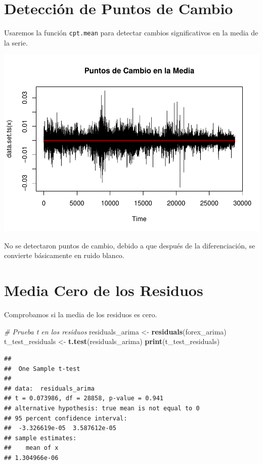\documentclass[
]{book}
\newenvironment{Shaded}{\begin{snugshade}}{\end{snugshade}}
\newcommand{\CommentTok}[1]{\textcolor[rgb]{0.56,0.35,0.01}{\textit{#1}}}
\newcommand{\FunctionTok}[1]{\textcolor[rgb]{0.13,0.29,0.53}{\textbf{#1}}}
\newcommand{\NormalTok}[1]{#1}
\newcommand{\OtherTok}[1]{\textcolor[rgb]{0.56,0.35,0.01}{#1}}
\begin{document}
\section{Detección de Puntos de Cambio}\label{detecciuxf3n-de-puntos-de-cambio}

Usaremos la función \texttt{cpt.mean} para detectar cambios significativos en la media de la serie.

\includegraphics{bookdown_time_series_files/figure-latex/change-point-1.pdf}

No se detectaron puntos de cambio, debido a que después de la diferenciación, se convierte básicamente en ruido blanco.

\section{Media Cero de los Residuos}\label{media-cero-de-los-residuos}

Comprobamos si la media de los residuos es cero.

\begin{Shaded}
\begin{Highlighting}[]
\CommentTok{\# Prueba t en los residuos}
\NormalTok{residuals\_arima }\OtherTok{\textless{}{-}} \FunctionTok{residuals}\NormalTok{(forex\_arima)}
\NormalTok{t\_test\_residuals }\OtherTok{\textless{}{-}} \FunctionTok{t.test}\NormalTok{(residuals\_arima)}
\FunctionTok{print}\NormalTok{(t\_test\_residuals)}
\end{Highlighting}
\end{Shaded}

\begin{verbatim}
## 
##  One Sample t-test
## 
## data:  residuals_arima
## t = 0.073986, df = 28858, p-value = 0.941
## alternative hypothesis: true mean is not equal to 0
## 95 percent confidence interval:
##  -3.326619e-05  3.587612e-05
## sample estimates:
##    mean of x 
## 1.304966e-06
\end{verbatim}
\end{document}
